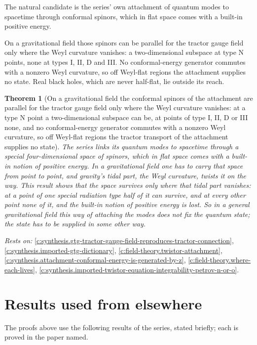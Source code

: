 \documentclass[11pt]{article}
\newtheorem{theorem}{Theorem}[section]
\theoremstyle{definition}
\theoremstyle{plain}
\begin{document}
The natural candidate is the series' own attachment of quantum modes to spacetime through conformal spinors, which in flat space comes with a built-in positive energy.

On a gravitational field those spinors can be parallel for the tractor gauge field only where the Weyl curvature vanishes: a two-dimensional subspace at type N points, none at types I, II, D and III. No conformal-energy generator commutes with a nonzero Weyl curvature, so off Weyl-flat regions the attachment supplies no state. Real black holes, which are never half-flat, lie outside its reach.

\begin{theorem}[On a gravitational field the conformal spinors of the attachment are parallel for the tractor gauge field only where the Weyl curvature vanishes: at a type N point a two-dimensional subspace can be, at points of type I, II, D or III none, and no conformal-energy generator commutes with a nonzero Weyl curvature, so off Weyl-flat regions the tractor transport of the attachment supplies no state]\label{c:synthesis.attachment-transport-is-flat-only-where-weyl-vanishes}
The series links its quantum modes to spacetime through a special four-dimensional space of spinors, which in flat space comes with a built-in notion of positive energy. In a gravitational field one has to carry that space from point to point, and gravity's tidal part, the Weyl curvature, twists it on the way. This result shows that the space survives only where that tidal part vanishes: at a point of one special radiation type half of it can survive, and at every other point none of it, and the built-in notion of positive energy is lost. So in a general gravitational field this way of attaching the modes does not fix the quantum state; the state has to be supplied in some other way.
\end{theorem}
\noindent\emph{Rests on:} \ref{c:synthesis.gtg-tractor-gauge-field-reproduces-tractor-connection}, \ref{c:synthesis.imported-gtg-dictionary}, \ref{c:field-theory.twistor-attachment}, \ref{c:synthesis.attachment-conformal-energy-is-generated-by-z}, \ref{c:field-theory.where-each-lives}, \ref{c:synthesis.imported-twistor-equation-integrability-petrov-n-or-o}.

\section{Results used from elsewhere}
The proofs above use the following results of the series, stated briefly; each is proved in the paper named.
\end{document}

